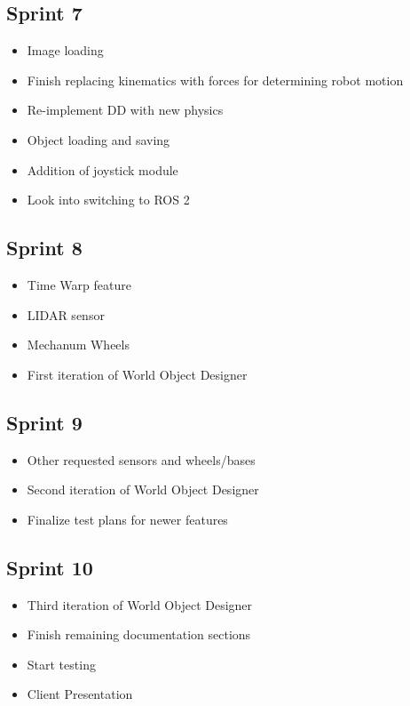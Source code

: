 \subsection{Sprint 7}
\begin{itemize}
	\item Image loading
	\item Finish replacing kinematics with forces for determining robot motion
	\item Re-implement DD with new physics
 	\item Object loading and saving
 	\item Addition of joystick module
 	\item Look into switching to ROS 2
\end{itemize}

\subsection{Sprint 8}
\begin{itemize}
	\item Time Warp feature
	\item LIDAR sensor
	\item Mechanum Wheels
	\item First iteration of World Object Designer
\end{itemize}

\subsection{Sprint 9}
\begin{itemize}
	\item Other requested sensors and wheels/bases
	\item Second iteration of World Object Designer
	\item Finalize test plans for newer features
\end{itemize}

\subsection{Sprint 10}
\begin{itemize}
	\item Third iteration of World Object Designer
	\item Finish remaining documentation sections
	\item Start testing
	\item Client Presentation
\end{itemize}

